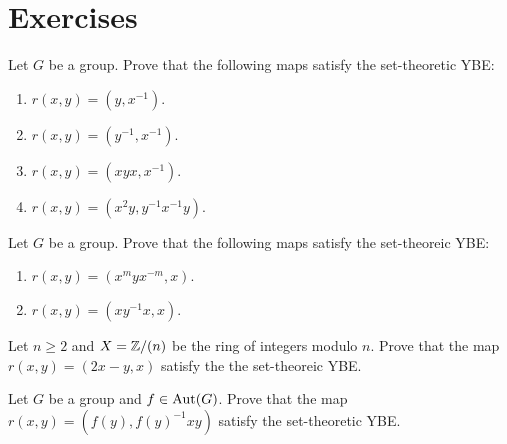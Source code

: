\section*{Exercises}

\begin{prob}
\label{prob:Wada}
Let $G$ be a group. Prove that the following maps satisfy the set-theoretic YBE:
\begin{enumerate}[label=\alph*)]
\item $r(x,y)=(y,x^{-1})$.
\item $r(x,y)=(y^{-1},x^{-1})$.
\item $r(x,y)=(xyx,x^{-1})$.
\item $r(x,y)=(x^2y,y^{-1}x^{-1}y)$.	
\end{enumerate}	
\end{prob}

\begin{prob}
\label{prob:Wada_racks}
	Let $G$ be a group. Prove that the following maps satisfy the set-theoreic YBE:
	\begin{enumerate}[label=\alph*)]
	\item $r(x,y)=(x^myx^{-m},x)$.
	\item $r(x,y)=(xy^{-1}x,x)$.
\end{enumerate}	
\end{prob}

\begin{prob}
\label{prob:D_n}
Let $n\geq2$ and $X=\mathbb{Z}/(n)$ be the ring of integers modulo $n$. Prove that
the map $r(x,y)=(2x-y,x)$ satisfy the the set-theoreic YBE.  	
\end{prob}


\begin{prob}
Let $G$ be a group and $f\in\operatorname{Aut}(G)$. Prove that 
the map $r(x,y)=(f(y),f(y)^{-1}xy)$ satisfy the set-theoretic YBE.	
\end{prob}



%
%
%


